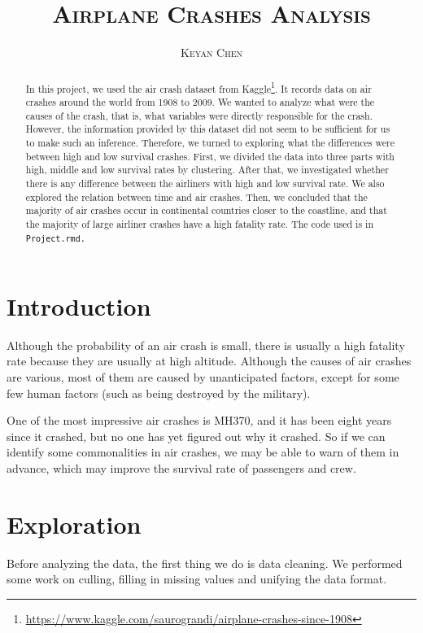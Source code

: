 \documentclass[12pt]{article}
\title{\textsc{Airplane Crashes Analysis}}
\author{\textsc{Keyan Chen}}
\begin{document}
\maketitle

\begin{abstract}
    In this project, we used the air crash dataset from Kaggle\footnote{\url{https://www.kaggle.com/saurograndi/airplane-crashes-since-1908}}. It records data on air crashes around the world from 1908 to 2009. We wanted to analyze what were the causes of the crash, that is, what variables were directly responsible for the crash. However, the information provided by this dataset did not seem to be sufficient for us to make such an inference. Therefore, we turned to exploring what the differences were between high and low survival crashes. First, we divided the data into three parts with high, middle and low survival rates by clustering. After that, we investigated whether there is any difference between the airliners with high and low survival rate. We also explored the relation between time and air crashes. Then, we concluded that the majority of air crashes occur in continental countries closer to the coastline, and that the majority of large airliner crashes have a high fatality rate. The code used is in \texttt{Project.rmd. }
\end{abstract}

\section{Introduction}

Although the probability of an air crash is small, there is usually a high fatality rate because they are usually at high altitude. Although the causes of air crashes are various, most of them are caused by unanticipated factors, except for some few human factors (such as being destroyed by the military). 

One of the most impressive air crashes is MH370, and it has been eight years since it crashed, but no one has yet figured out why it crashed. So if we can identify some commonalities in air crashes, we may be able to warn of them in advance, which may improve the survival rate of passengers and crew. 

\section{Exploration}

Before analyzing the data, the first thing we do is data cleaning. We performed some work on culling, filling in missing values and unifying the data format. 
\end{document}
